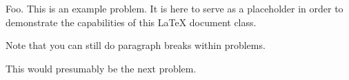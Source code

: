 \documentclass{homework}
\begin{document}
\thispagestyle{followingpage}
Foo.
 This is an example problem. It is here to serve as a
placeholder in order to demonstrate the capabilities of this \LaTeX{}
document class.

Note that you can still do paragraph breaks within problems.

 This would presumably be the next problem.
\end{document}
